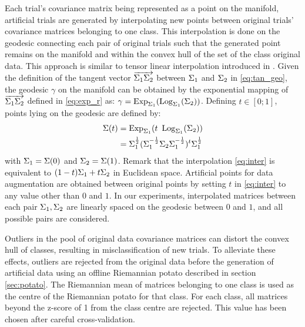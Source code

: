 Each trial's covariance matrix being represented as a point on the manifold, artificial trials are generated by interpolating new points between original trials' covariance matrices belonging to one class. 
This interpolation is done on the geodesic connecting each pair of original trials such that the generated point remains on the manifold and within the convex hull of the set of the class original data.
This approach is similar to tensor linear interpolation introduced in \citep{pennec_riemannian_2006}. %
Given the definition of the tangent vector $\overrightarrow{\P_1 \P_2}$ between $\P_1$ and $\P_2$ in \eqref{eq:tan_geo}, the geodesic $\gamma$ on the manifold can be obtained by the exponential mapping of $\overrightarrow{\P_1 \P_2}$ defined in \eqref{eq:exp_r} as:
$\gamma = \Exp{\P_1}(\Log{\P_1}(\P_2))$. 
Defining $t \in [0;1]$, points lying on the geodesic are defined by:
\begin{equation}
\label{eq:inter}
\begin{split}
\P(t) & = \Exp{\P_1}(t ~ \Log{\P_1}(\P_2))\\ 
& = \P_1^{\frac{1}{2}} ( \P_1^{-\frac{1}{2}} \P_2 \P_1^{-\frac{1}{2}} )^t \P_1^{\frac{1}{2}}  
\end{split}
\end{equation} 
with $\P_1 = \P(0)$ and $\P_2 = \P(1)$. Remark that the interpolation \eqref{eq:inter} is equivalent to $(1-t)\P_1 + t\P_2$ in Euclidean space.
Artificial points for data augmentation are obtained between original points by setting $t$ in \eqref{eq:inter} to any value other than $0$ and $1$.
In our experiments, interpolated matrices between each pair $\P_1,\P_2$ are linearly spaced on the geodesic between $0$ and $1$, and all possible pairs are considered.

Outliers in the pool of original data covariance matrices can distort the convex hull of classes, resulting in misclassification of new trials.
To alleviate these effects, outliers are rejected from the original data before the generation of artificial data using an offline Riemannian potato described in section \ref{sec:potato}. 
The Riemannian mean of matrices belonging to one class is used as the centre of the Riemannian potato for that class. 
For each class, all matrices beyond the z-score of 1 from the class centre are rejected.
This value has been chosen after careful cross-validation. 

